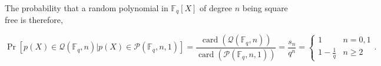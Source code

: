 The probability that a random polynomial in $\mathbb{F}_q[X]$ of degree $n$ being square free is therefore, 

\[\Pr[p(X)\in \mathcal{Q}(\mathbb{F}_q,n) | p(X) \in \mathcal{P}(\mathbb{F}_q, n,1)] = \dfrac{\operatorname{card}(\mathcal{Q}(\mathbb{F}_q,n))}{\operatorname{card}(\mathcal{P}(\mathbb{F}_q, n,1))} = \dfrac{s_n}{q^n} = \begin{cases}1 & n=0,1 \\ 1-\frac{1}{q} & n\geq 2\end{cases}.\]



